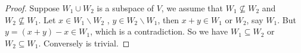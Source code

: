 \begin{proof}
	Suppose $W_{1} \cup W_{2}$ is a subspace of $V$, we assume that $W_{1} \nsubseteq W_{2}$ and $W_{2} \nsubseteq W_{1}$. Let $x \in W_{1} \backslash W_{2}$ , $y \in W_{2} \backslash W_{1}$, then $x+y \in W_{1}$ or $W_{2}$, say $W_{1}$. But $y=(x+y)-x \in W_{1}$, which is a contradiction. So we have $W_{1} \subseteq W_{2}$ or $W_{2} \subseteq W_{1}$. Conversely is trivial.
\end{proof}